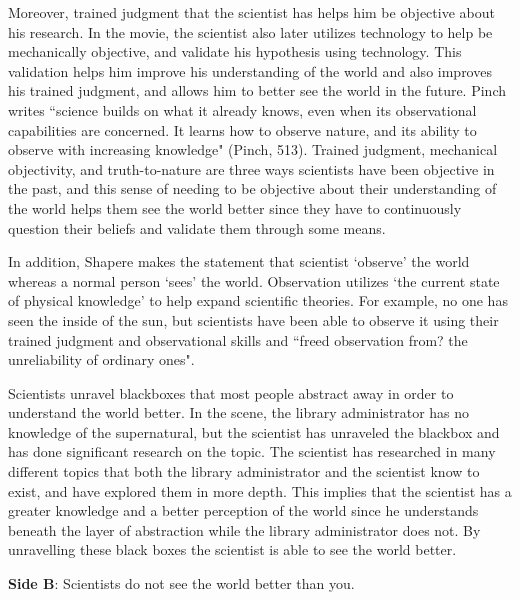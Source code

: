 \documentclass[11pt, oneside]{article}
\begin{document}
\par Moreover, trained judgment that the scientist has helps him be objective about his research. In the movie, the scientist also later utilizes technology to help be mechanically objective, and validate his hypothesis using technology. This validation helps him improve his understanding of the world and also improves his trained judgment, and allows him to better see the world in the future. Pinch writes ``science builds on what it already knows, even when its observational capabilities are concerned. It learns how to observe nature, and its ability to observe with increasing knowledge" (Pinch, 513). Trained judgment, mechanical objectivity, and truth-to-nature are three ways scientists have been objective in the past, and this sense of needing to be objective about their understanding of the world helps them see the world better since they have to continuously question their beliefs and validate them through some means. 

\par In addition, Shapere makes the statement that scientist `observe' the world whereas a normal person `sees' the world. Observation utilizes `the current state of physical knowledge' to help expand scientific theories. For example, no one has seen the inside of the sun, but scientists have been able to observe it using their trained judgment and observational skills and ``freed observation from? the unreliability of ordinary ones".

\par Scientists unravel blackboxes that most people abstract away in order to understand the world better. In the scene, the library administrator has no knowledge of the supernatural, but the scientist has unraveled the blackbox and has done significant research on the topic. The scientist has researched in many different topics that both the library administrator and the scientist know to exist, and have explored them in more depth. This implies that the scientist has a greater knowledge and a better perception of the world since he understands beneath the layer of abstraction while the library administrator does not. By unravelling these black boxes the scientist is able to see the world better.

\noindent \textbf{Side B}: Scientists do not see the world better than you.

\end{document}
